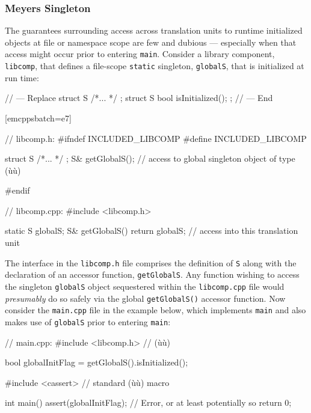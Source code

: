 \subsubsection[Meyers Singleton]{Meyers Singleton}\label{meyers-singleton}

The guarantees surrounding access across translation units to runtime
initialized objects at file or namespace scope are few and dubious ---
especially when that access might occur prior to entering \lstinline!main!.
Consider a library component, \lstinline!libcomp!, that defines a
file-scope \lstinline!static! singleton, \lstinline!globalS!, that is
initialized at run time:

\begin{emcppshiddenlisting}[emcppsbatch=e7]
// --- Replace
struct S { /*... */ };
struct S {
  bool isInitialized();
};
// --- End
\end{emcppshiddenlisting}[emcppsbatch=e7]
\begin{emcppslisting}[emcppsbatch=e7]
// libcomp.h:
#ifndef INCLUDED_LIBCOMP
#define INCLUDED_LIBCOMP

struct S { /*... */ };
S& getGlobalS();  // access to global singleton object of type (ù{}ù)

#endif
\end{emcppslisting}


\begin{emcppslisting}[emcppsbatch=e7]
// libcomp.cpp:
#include <libcomp.h>

static S globalS;
S& getGlobalS() { return globalS; }  // access into this translation unit
\end{emcppslisting}

\noindent The interface in the \lstinline!libcomp.h! file comprises the definition of
\lstinline!S! along with the declaration of an accessor function,
\lstinline!getGlobalS!. Any function wishing to access the singleton
\lstinline!globalS! object sequestered within the \lstinline!libcomp.cpp! file
would \emph{presumably} do so safely via the global
\lstinline!getGlobalS()! accessor function. Now consider the
\lstinline!main.cpp! file in the example below, which implements
\lstinline!main! and also makes use of \lstinline!globalS! prior to entering
\lstinline!main!:

\begin{emcppslisting}[emcppsbatch=e7]
// main.cpp:
#include <libcomp.h>  // (ù{}ù)

bool globalInitFlag = getGlobalS().isInitialized();

#include <cassert>  // standard (ù{}ù) macro

int main()
{
    assert(globalInitFlag);   // Error, or at least potentially so
    return 0;
}
\end{emcppslisting}

